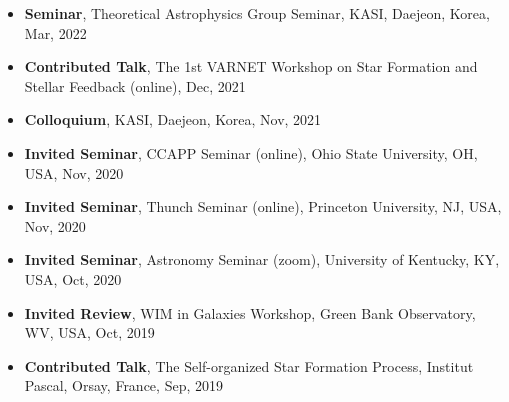 \documentclass[11pt,letterpaper,roman]{moderncv}        %
\begin{document}
\begin{itemize}
\item \textbf{Seminar},
  Theoretical Astrophysics Group Seminar, KASI, Daejeon, Korea, Mar, 2022 %
\item \textbf{Contributed Talk},
  The 1st VARNET Workshop on Star Formation and Stellar Feedback (online), Dec, 2021 %
\item \textbf{Colloquium},
  KASI, Daejeon, Korea, Nov, 2021 %
\item \textbf{Invited Seminar},
  CCAPP Seminar (online), Ohio State University, OH, USA, Nov, 2020 %
\item \textbf{Invited Seminar},
  Thunch Seminar (online), Princeton University, NJ, USA, Nov, 2020 %
\item \textbf{Invited Seminar},
  Astronomy Seminar (zoom), University of Kentucky, KY, USA, Oct, 2020 %
\item \textbf{Invited Review},
  WIM in Galaxies Workshop, Green Bank Observatory, WV, USA, Oct, 2019 %
\item \textbf{Contributed Talk},
  The Self-organized Star Formation Process, Institut Pascal, Orsay, France, Sep, 2019 %

\end{itemize}
\end{document}
